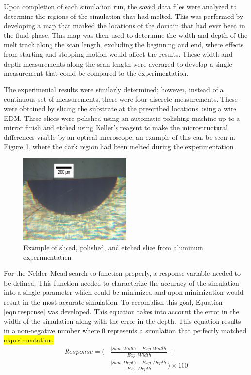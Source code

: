 \documentclass[metals,article,accept,pdftex,moreauthors]{Definitions/mdpi}
\begin{document}
Upon completion of each simulation run, the saved data files were analyzed to determine 
the regions of the simulation that had melted.  This was performed by developing a map 
that marked the locations of the domain that had ever been in the fluid phase.  This map 
was then used to determine the width and depth of the melt track along the scan length, 
excluding the beginning and end, where effects from starting and stopping motion would 
affect the results.  These width and depth measurements along the scan length were 
averaged to develop a single measurement that could be compared to the 
experimentation.  

The experimental results were similarly determined; however, instead of a continuous set 
of measurements, there were four discrete measurements.  These were obtained by slicing 
the substrate at the prescribed locations using a wire \ac{EDM}.  These slices were 
polished using an automatic polishing machine up to a mirror finish and etched using 
Keller's reagent to make the microstructural differences visible by an optical microscope; 
an example of this can be seen in Figure \ref{fig:7075_7_8C}, where the dark region had 
been melted during the experimentation.

\begin{figure}[H]
\includegraphics[width=0.5\textwidth]{7075_7_8C}
\caption{Example of sliced, polished, and etched slice from aluminum experimentation}
\label{fig:7075_7_8C}
\end{figure}

For the Nelder--Mead search to function properly, a response variable needed to be 
defined.  This function needed to characterize the accuracy of the simulation into a single 
parameter which could be minimized and upon minimization would result in the most 
accurate simulation.  To accomplish this goal, Equation \eqref{eqn:response} was 
developed.  This equation takes into account the error in the width of the simulation along 
with the error in the depth.  This equation results in a non-negative number where 0 
represents a simulation that perfectly matched \hl{experimentation.} %
\begin{equation}\label{eqn:response}
	\begin{split}
		Response =  \Biggl ( &\frac{\lvert Sim.\ Width - Exp.\ Width \rvert}{Exp.\ Width} + \\ 
		&\frac{\lvert Sim.\ Depth - Exp.\ Depth \rvert}{Exp.\ Depth} \Biggr ) \times 100
	\end{split}
\end{equation}
\end{document}
